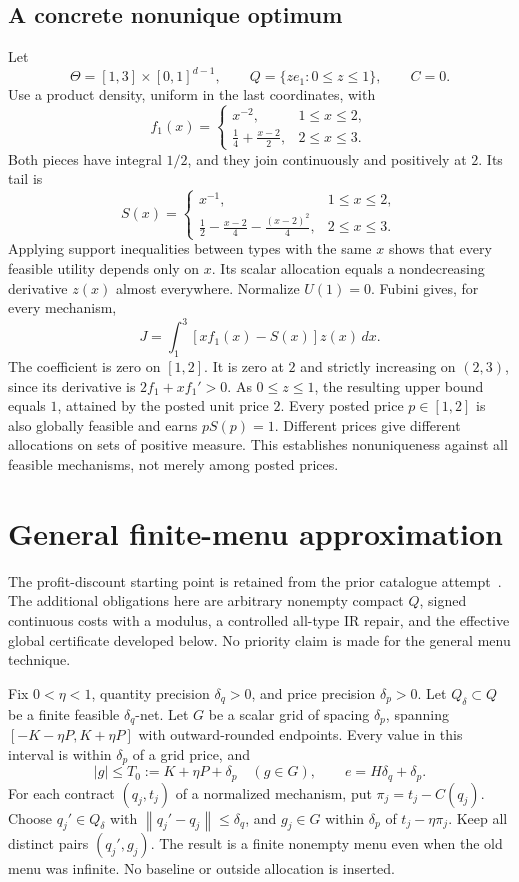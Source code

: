 \documentclass[11pt,a4paper]{article}
\numberwithin{equation}{section}
\newcommand{\norm}[1]{\left\lVert #1\right\rVert}
\begin{document}
\subsection{A concrete nonunique optimum}\label{sec:nonunique}
Let
\[
 \Theta=[1,3]\times[0,1]^{d-1},\qquad
 Q=\{ze_1:0\le z\le1\},\qquad C=0.
\]
Use a product density, uniform in the last coordinates, with
\[
 f_1(x)=
 \begin{cases}x^{-2},&1\le x\le2,\\
 \frac14+\frac{x-2}{2},&2\le x\le3.\end{cases}
\]
Both pieces have integral \(1/2\), and they join continuously and
positively at \(2\). Its tail is
\[
 S(x)=
 \begin{cases}x^{-1},&1\le x\le2,\\
 \frac12-\frac{x-2}{4}-\frac{(x-2)^2}{4},&2\le x\le3.
 \end{cases}
\]
Applying support inequalities between types with the same \(x\) shows
that every feasible utility depends only on \(x\).
Its scalar allocation equals a nondecreasing derivative \(z(x)\)
almost everywhere. Normalize \(U(1)=0\). Fubini gives, for every mechanism,
\[
 J=\int_1^3[xf_1(x)-S(x)]z(x)\,dx.
\]
The coefficient is zero on \([1,2]\). It is zero at \(2\) and strictly
increasing on \((2,3)\), since its derivative is \(2f_1+xf_1'>0\).
As \(0\le z\le1\), the resulting upper bound equals \(1\), attained
by the posted unit price \(2\).
Every posted price \(p\in[1,2]\) is also globally feasible and earns
\(pS(p)=1\). Different prices give different allocations on sets of
positive measure. This establishes nonuniqueness against all feasible
mechanisms, not merely among posted prices.

\section{General finite-menu approximation}\label{sec:rounding}
The profit-discount starting point is retained from the prior catalogue
attempt~\cite{PriorAttempt}. The additional obligations here are arbitrary
nonempty compact \(Q\), signed continuous costs with a modulus, a
controlled all-type IR repair, and the effective global certificate
developed below. No priority claim is made for the general menu technique.

Fix \(0<\eta<1\), quantity precision \(\delta_q>0\), and price precision
\(\delta_p>0\).
Let \(Q_\delta\subset Q\) be a finite feasible \(\delta_q\)-net.
Let \(G\) be a scalar grid of spacing \(\delta_p\), spanning
\([-K-\eta P,K+\eta P]\) with outward-rounded endpoints.
Every value in this interval is within \(\delta_p\) of a grid price, and
\[
 |g|\le T_0:=K+\eta P+\delta_p\quad(g\in G),\qquad
 e=H\delta_q+\delta_p.
\]
For each contract \((q_j,t_j)\) of a normalized mechanism, put
\(\pi_j=t_j-C(q_j)\). Choose \(q_j'\in Q_\delta\) with
\(\norm{q_j'-q_j}\le\delta_q\), and \(g_j\in G\) within \(\delta_p\)
of \(t_j-\eta\pi_j\). Keep all distinct pairs \((q_j',g_j)\).
The result is a finite nonempty menu even when the old menu was infinite.
No baseline or outside allocation is inserted.
\end{document}
